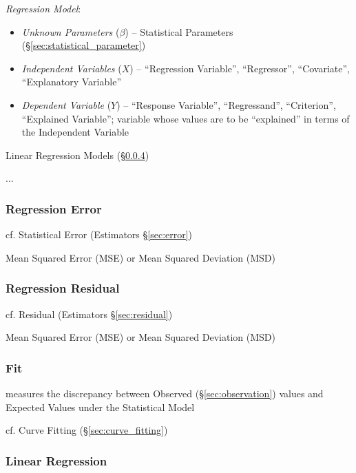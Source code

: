 \emph{Regression Model}:
\begin{itemize}
  \item \emph{Unknown Parameters} ($\beta$) -- Statistical Parameters
    (\S\ref{sec:statistical_parameter})
  \item \emph{Independent Variables} ($X$) -- ``Regression Variable'',
    ``Regressor'', ``Covariate'', ``Explanatory Variable''
  \item \emph{Dependent Variable} ($Y$) -- ``Response Variable'',
    ``Regressand'', ``Criterion'', ``Explained Variable''; variable whose values
    are to be ``explained'' in terms of the Independent Variable
\end{itemize}

Linear Regression Models (\S\ref{sec:linear_regression})

...



\subsubsection{Regression Error}\label{sec:regression_error}

\fist cf. Statistical Error (Estimators \S\ref{sec:error})

Mean Squared Error (MSE) or Mean Squared Deviation (MSD)



\subsubsection{Regression Residual}\label{sec:regression_residual}

\fist cf. Residual (Estimators \S\ref{sec:residual})

Mean Squared Error (MSE) or Mean Squared Deviation (MSD)



\subsubsection{Fit}\label{sec:model_fit}

measures the discrepancy between Observed (\S\ref{sec:observation}) values and
Expected Values under the Statistical Model


cf. Curve Fitting (\S\ref{sec:curve_fitting})



\subsubsection{Linear Regression}\label{sec:linear_regression}

